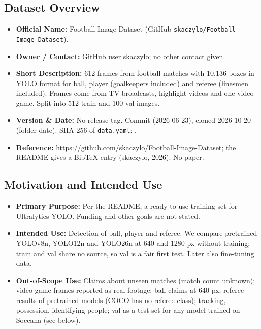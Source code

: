 \documentclass[11pt, a4paper]{article}
\begin{document}
\subsection{Dataset Overview}
\begin{itemize}
    \item \textbf{Official Name:} Football Image Dataset (GitHub \texttt{skaczylo/Football-Image-Dataset}).
    \item \textbf{Owner / Contact:} GitHub user skaczylo; no other contact given.
    \item \textbf{Short Description:} 612 frames from football matches with 10,136 boxes in YOLO format for ball, player (goalkeepers included) and referee (linesmen included). Frames come from TV broadcasts, highlight videos and one video game. Split into 512 train and 100 val images.
    \item \textbf{Version \& Date:} No release tag. Commit  (2026-06-23), cloned 2026-10-20 (folder date). SHA-256 of \texttt{data.yaml}: .
    \item \textbf{Reference:} \url{https://github.com/skaczylo/Football-Image-Dataset}; the README gives a BibTeX entry (skaczylo, 2026). No paper.
\end{itemize}

\subsection{Motivation and Intended Use}
\begin{itemize}
    \item \textbf{Primary Purpose:} Per the README, a ready-to-use training set for Ultralytics YOLO. Funding and other goals are not stated.
    \item \textbf{Intended Use:} Detection of ball, player and referee. We compare pretrained YOLOv8n, YOLO12n and YOLO26n at 640 and 1280 px without training; train and val share no source, so val is a fair first test. Later also fine-tuning data.
    \item \textbf{Out-of-Scope Use:} Claims about unseen matches (match count unknown); video-game frames reported as real footage; ball claims at 640 px; referee results of pretrained models (COCO has no referee class); tracking, possession, identifying people; val as a test set for any model trained on Soccana (see below).
\end{itemize}
\end{document}
